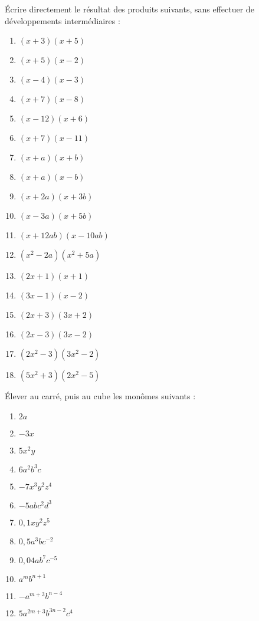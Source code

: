 \begin{exercice}\'Ecrire directement le résultat des produits suivants, sans effectuer de développements intermédiaires :
\begin{multicols}{2}
\begin{enumerate}
\item $\left( x+3 \right)\left( x+5 \right)$	
\item $\left( x+5 \right)\left( x-2 \right)$	
\item $\left( x-4 \right)\left( x-3 \right)$	
\item $\left( x+7 \right)\left( x-8 \right)$		
\item $\left( x-12 \right)\left( x+6 \right)$	
\item $\left( x+7 \right)\left( x-11 \right)$	
\item $\left( x+a \right)\left( x+b \right)$	
\item $\left( x+a \right)\left( x-b \right)$	
\item $\left( x+2a \right)\left( x+3b \right)$	
\item $\left( x-3a \right)\left( x+5b \right)$
\item $\left( x+12ab \right)\left( x-10ab \right)$ 
\item $\left( {{x}^{2}}-2a \right)\left( {{x}^{2}}+5a \right)$
\item $\left( 2x+1 \right)\left( x+1 \right)$
\item $\left( 3x-1 \right)\left( x-2 \right)$ 
\item $\left( 2x+3 \right)\left( 3x+2 \right)$
\item $\left( 2x-3 \right)\left( 3x-2 \right)$
\item $\left( 2{{x}^{2}}-3 \right)\left( 3{{x}^{2}}-2 \right)$
\item $\left( 5{{x}^{2}}+3 \right)\left( 2{{x}^{2}}-5 \right)$
\end{enumerate}
\end{multicols}
\end{exercice}

\begin{exercice} \'Elever au carré, puis au cube les monômes suivants :
\begin{multicols}{2}
\begin{enumerate}
\item $2a$	
\item $-3x$	
\item $5{{x}^{2}}y$	
\item $6{{a}^{2}}{{b}^{3}}c$	
\item $-7{{x}^{3}}{{y}^{2}}{{z}^{4}}$	
\item $-5ab{{c}^{2}}{{d}^{3}}$	
\item $0,1x{{y}^{2}}{{z}^{5}}$	
\item $0,5{{a}^{3}}b{{c}^{-2}}$	
\item $0,04a{{b}^{7}}{{c}^{-5}}$
\item ${{a}^{m}}{{b}^{n+1}}$
\item $-{{a}^{m+3}}{{b}^{n-4}}$
\item $5{{a}^{2m+3}}{{b}^{3n-2}}{{c}^{4}}$
\end{enumerate}
\end{multicols}
\end{exercice}

